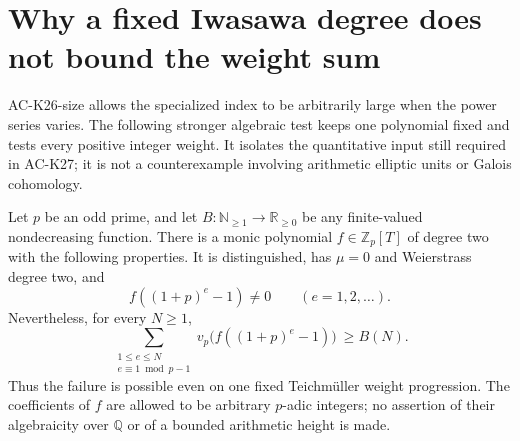 \section{Why a fixed Iwasawa degree does not bound the weight sum}
\label{sec:fixed-iwasawa-growth-obstruction}

AC-K26-size allows the specialized index to be arbitrarily large
when the power series varies.  The following stronger algebraic
test keeps one polynomial fixed and tests every positive integer
weight.  It isolates the quantitative input still required in
AC-K27; it is not a counterexample involving arithmetic elliptic
units or Galois cohomology.

\begin{theorem}
\label{AC-K28}
Let $p$ be an odd prime, and let
$B:\mathbb N_{\ge1}\to\mathbb R_{\ge0}$ be any finite-valued
nondecreasing function.  There is a monic polynomial
$f\in\mathbb Z_p[T]$ of degree two with the following properties.
It is distinguished, has $\mu=0$ and Weierstrass degree two,
and
\[
 f((1+p)^e-1)\ne0\qquad(e=1,2,\ldots).
                                                        \tag{IW.1}
\]
Nevertheless, for every $N\ge1$,
\[
 \sum_{\substack{1\le e\le N\\e\equiv1\bmod p-1}}
       v_p\bigl(f((1+p)^e-1)\bigr)\ \ge B(N).
                                                        \tag{IW.2}
\]
Thus the failure is possible even on one fixed Teichm\"uller
weight progression.  The coefficients of $f$ are allowed to be
arbitrary $p$-adic integers; no assertion of their algebraicity
over $\mathbb Q$ or of a bounded arithmetic height is made.
\end{theorem}
